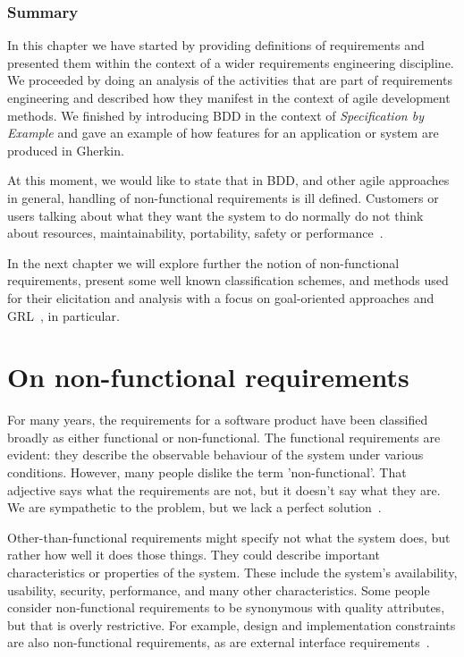 \documentclass[dissertation,final]{softeng}
\begin{document}
\subsection{Summary}

In this chapter we have started by providing definitions of requirements and presented them within the context of a wider requirements engineering discipline. We proceeded by doing an analysis of the activities that are part of requirements engineering and described how they manifest in the context of agile development methods. We finished by introducing BDD in the context of \emph{Specification by Example} and gave an example of how features for an application or system are produced in Gherkin.

At this moment, we would like to state that in BDD, and other agile approaches in general, handling of non-functional requirements is ill defined. Customers or users talking about what they want the system to do normally do not think about resources, maintainability, portability, safety or performance~\citep{Paetsch:2003tl}. 

In the next chapter we will explore further the notion of non-functional requirements, present some well known classification schemes, and methods used for their elicitation and analysis with a focus on goal-oriented approaches and GRL~\citep{Amyot2010}, in particular.

\chapter{On non-functional requirements}
\label{ch:nfr_research}
For many years, the requirements for a software product have been classified broadly as either functional or non-functional. The functional requirements are evident: they describe the observable behaviour of the system under various conditions. However, many people dislike the term 'non-functional'. That adjective says what the requirements are not, but it doesn't say what they are. We are sympathetic to the problem, but we lack a perfect solution~\citep{Wiegers2013}.

Other-than-functional requirements might specify not what the system does, but rather how well it does those things. They could describe important characteristics or properties of the system. These include the system's availability, usability, security, performance, and many other characteristics. Some people consider non-functional requirements to be synonymous with quality attributes, but that is overly restrictive. For example, design and implementation constraints are also non-functional requirements, as are external interface requirements~\citep{Wiegers2013}.
\end{document}
